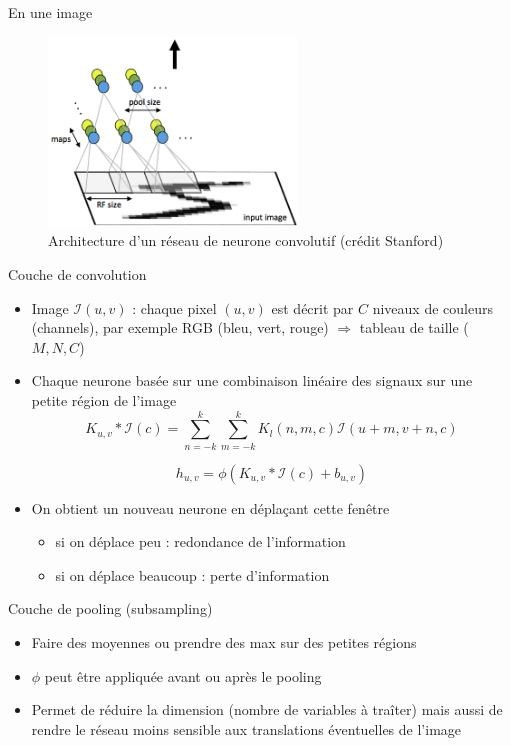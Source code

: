 \documentclass[ignorenonframetext,]{beamer}
\providecommand{\tightlist}{%
  \setlength{\itemsep}{0pt}\setlength{\parskip}{0pt}}
\begin{document}
\begin{frame}{En une image}

\begin{figure}
\centering
\includegraphics[width=2.60417in]{Cnn_layer_standford.png}
\caption{Architecture d'un réseau de neurone convolutif (crédit
Stanford)}
\end{figure}

\end{frame}

\begin{frame}{Couche de convolution}

\begin{itemize}
\item
  Image \(\mathcal{I}(u,v)\) : chaque pixel \((u,v)\) est décrit par
  \(C\) niveaux de couleurs (channels), par exemple RGB (bleu, vert,
  rouge) \(\Rightarrow\) tableau de taille (\(M,N,C\))
\item
  Chaque neurone basée sur une combinaison linéaire des signaux sur une
  petite région de l'image
  \[K_{u,v}*\mathcal{I}(c) =  \sum_{n=-k}^{k}\sum_{m=-k}^k K_l(n,m,c)\mathcal{I}\left(u+m,v+n,c \right)\]

  \[h_{u,v} = \phi(K_{u,v}*\mathcal{I}(c)+b_{u,v})\]
\item
  On obtient un nouveau neurone en déplaçant cette fenêtre

  \begin{itemize}
  \tightlist
  \item
    si on déplace peu : redondance de l'information
  \item
    si on déplace beaucoup : perte d'information
  \end{itemize}
\end{itemize}

\end{frame}

\begin{frame}{Couche de pooling (subsampling)}

\begin{itemize}
\tightlist
\item
  Faire des moyennes ou prendre des max sur des petites régions
\item
  \(\phi\) peut être appliquée avant ou après le pooling
\item
  Permet de réduire la dimension (nombre de variables à traîter) mais
  aussi de rendre le réseau moins sensible aux translations éventuelles
  de l'image
\end{itemize}

\end{frame}
\end{document}
